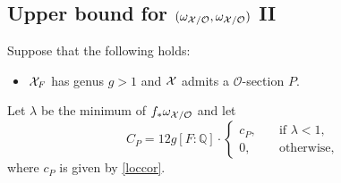 \documentclass[]{amsart}
\newcommand{\BQ}{{\mathbb {Q}}} \newcommand{\BR}{{\mathbb {R}}}
\newcommand{\CO}{{\mathcal {O}}} \newcommand{\CP}{{\mathcal {P}}}
\theoremstyle{plain}
\theoremstyle{remark} \newtheorem{remark}[thm]{Remark}
\theoremstyle{remark} \newtheorem{exercise}{Exercise}
\theoremstyle{remark} \newtheorem{example}{Example}
\numberwithin{equation}{section}
\begin{document}
\subsection{Upper bound for $(\omega_{\CX/\CO},\omega_{\CX/\CO})$ II}
Suppose that the  following holds:
\begin{itemize}
  \item [(A)] ${\mathcal {X}}_F$ has genus $g>1$ and ${\mathcal {X}}$ admits a $\CO$-section $P$.
\end{itemize} 
  Let $\lambda$ be the minimum of $f_*\omega_{\CX/\CO}$ and let \[C_P=12g[F:\BQ]\cdot \begin{cases}
 c_P,&\quad \text{if $\lambda<1$},\\
 0,&\quad \text{otherwise},
\end{cases}
\] where $c_P$ is given by \eqref{loccor}.
\end{document}
